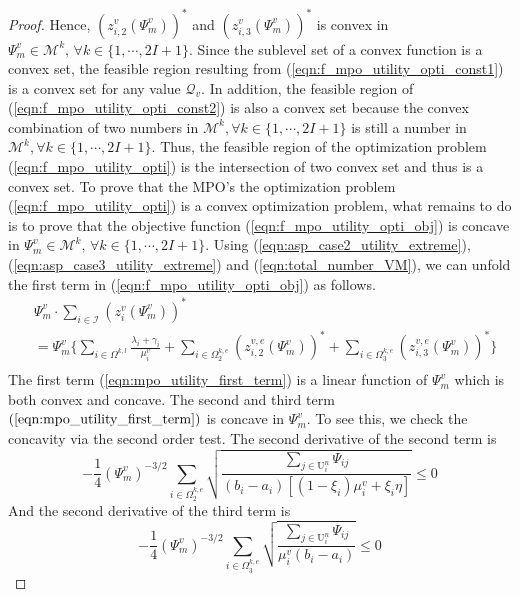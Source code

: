 \documentclass[conference]{IEEEtran}
\begin{document}
\begin{proof}
Hence, $(z_{i,2}^v(\Psi_m^v))^*$ and $(z_{i,3}^v(\Psi_m^v))^*$ is convex in $\Psi_m^v \in \mathcal{M}^k,\, \forall k \in \{1,\cdots, 2I+1\}$. Since the sublevel set of a convex function is a convex set, the feasible region resulting from (\ref{eqn:f_mpo_utility_opti_const1}) is a convex set for any value $\mathcal{Q}_v$. In addition, the feasible region of (\ref{eqn:f_mpo_utility_opti_const2}) is also a convex set because the convex combination of two numbers in $\mathcal{M}^k, \forall k \in \{1, \cdots, 2I+1\}$ is still a number in $\mathcal{M}^k, \forall k \in \{1, \cdots, 2I+1\}$. Thus, the feasible region of the optimization problem (\ref{eqn:f_mpo_utility_opti}) is the intersection of two convex set and thus is a convex set. To prove that the MPO's the optimization problem (\ref{eqn:f_mpo_utility_opti}) is a convex optimization problem, what remains to do is to prove that the objective function (\ref{eqn:f_mpo_utility_opti_obj}) is concave in $\Psi_m^v \in \mathcal{M}^k,\, \forall k \in \{1,\cdots, 2I+1\}$. Using (\ref{eqn:asp_case2_utility_extreme}), (\ref{eqn:asp_case3_utility_extreme}) and (\ref{eqn:total_number_VM}), we can unfold the first term in (\ref{eqn:f_mpo_utility_opti_obj}) as follows.
\begin{align} \label{eqn:mpo_utility_first_term}
&\Psi_m^v \cdot \sum_{i \in \mathcal{I}} (z_{i}^v(\Psi_m^v))^* \\
&= \Psi_m^v\{\sum_{i\in \Omega^{k,l}}\frac{\lambda_i + \gamma_i}{\mu_i^v} + \sum_{i\in \Omega^{k,e}_{2}}(z_{i,2}^{v,e}(\Psi_m^v))^* +\sum_{i\in \Omega^{k,e}_{3}}(z_{i,3}^{v,e}(\Psi_m^v))^*\} \nonumber\\
\end{align}
The first term (\ref{eqn:mpo_utility_first_term}) is a linear function of $\Psi_m^v$ which is both convex and concave. The second and third term $(\ref{eqn:mpo_utility_first_term})$ is concave in $\Psi_m^v$. To see this, we check the concavity via the second order test. The second derivative of the second term is
\begin{equation}
-\frac{1}{4}(\Psi_m^v)^{-3/2}\sum_{i \in \Omega_2^{k,e}} \sqrt{\frac{\sum_{j \in \mathrm{U}_i^n}\Psi_{ij}}{(b_i-a_i)[(1-\xi_i)\mu_i^v + \xi_i \eta]}} \leq 0
\end{equation}
And the second derivative of the third term is
\begin{equation}
-\frac{1}{4}(\Psi_m^v)^{-3/2}\sum_{i \in \Omega_3^{k,e}} \sqrt{\frac{\sum_{j \in \mathrm{U}_i^n}\Psi_{ij}}{\mu_i^v(b_i-a_i)}} \leq 0
\end{equation}

\end{proof}
\end{document}

